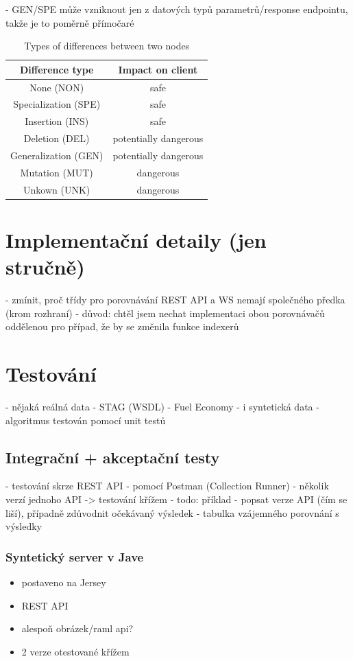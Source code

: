 \documentclass[czech,DP]{thesiskiv}
\begin{document}
	- GEN/SPE může vzniknout jen z datových typů parametrů/response endpointu, takže je to poměrně přímočaré

\begin{table}[h!]
	\centering
	\begin{tabular}{c|c}
		Difference type & Impact on client  \\
		\hline
		None (NON) & safe \\
		Specialization (SPE) & safe  \\
		Insertion (INS) & safe \\
		Deletion (DEL) & potentially dangerous \\
		Generalization (GEN) & potentially dangerous \\
		Mutation (MUT) & dangerous \\
		Unkown (UNK) & dangerous
	\end{tabular}
	\caption{Types of differences between two nodes }
	\label{tab:diff-level}
\end{table}

\chapter{Implementační detaily (jen stručně)}

 - zmínit, proč třídy pro porovnávání REST API a WS nemají společného předka (krom rozhraní)
 	- důvod: chtěl jsem nechat implementaci obou porovnávačů oddělenou pro případ, že by se změnila funkce indexerů

\chapter{Testování}

- nějaká reálná data
	- STAG (WSDL)
	- Fuel Economy
- i syntetická data
- algoritmus testován pomocí unit testů

\section{Integrační + akceptační testy}

- testování skrze REST API
- pomocí Postman (Collection Runner)
- několik verzí jednoho API -> testování křížem
- todo: příklad
	- popsat verze API (čím se liší), případně zdůvodnit očekávaný výsledek
	- tabulka vzájemného porovnání s výsledky

\subsection{Syntetický server v Jave}
\begin{itemize}
	\item postaveno na Jersey
	\item REST API
	\item alespoň obrázek/raml api?
	\item 2 verze otestované křížem
\end{itemize}
\end{document}
